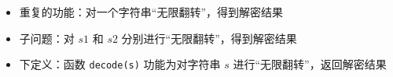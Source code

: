 \begin{frame}[fragile]
{\begin{itemize}
            \item 重复的功能：对一个字符串“无限翻转”，得到解密结果
            \item 子问题：对 $s1$ 和 $s2$ 分别进行“无限翻转”，得到解密结果
            \item 下定义：函数 \lstinline|decode(s)| 功能为对字符串 $s$ 进行“无限翻转”，返回解密结果

        \end{itemize}
    }

\end{frame}
